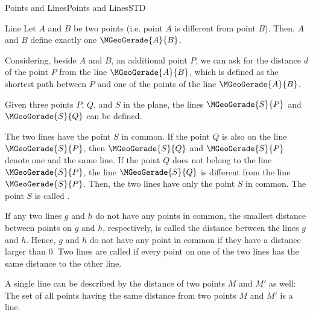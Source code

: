 \begin{MXContent}{Points and Lines}{Points and Lines}{STD}
\begin{MXInfo}{Line}
Let $A$ and $B$ be two points (i.e. point $A$ is different from point $B$). Then, $A$ and $B$ define
exactly one  $\MGeoGerade{A}{B}$.
\end{MXInfo}

Considering, beside $A$ and $B$, an additional point $P$, we can ask for the distance $d$ of the point 
$P$ from the line $\MGeoGerade{A}{B}$, which is defined as the shortest path between $P$ and one of 
the points of the line $\MGeoGerade{A}{B}$.

\begin{center}
\end{center}

Given three points $P$, $Q$, and $S$ in the plane, the lines $\MGeoGerade{S}{P}$ and 
$\MGeoGerade{S}{Q}$ can be defined.

The two lines have the point $S$ in common. If the point $Q$ is also on the line $\MGeoGerade{S}{P}$,
then $\MGeoGerade{S}{Q}$ and $\MGeoGerade{S}{P}$ denote one and the same line. If the 
point $Q$ does not belong to the line $\MGeoGerade{S}{P}$, the line $\MGeoGerade{S}{Q}$ is
different from the line $\MGeoGerade{S}{P}$. Then, the two lines have only the point $S$ in common.
The point $S$ is called . 

If any two lines $g$ and $h$ do not have any points in common, the smallest 
distance between points on $g$ and $h$, respectively, is called the distance between 
the lines $g$ and $h$. Hence, $g$ and $h$ do not have any point in common if they have 
a distance larger than $0$. Two lines are called  if every point 
on one of the two lines has the same distance to the other line.

A single line can be described by the distance of two points $M$ and $M'$ as well: The set 
of all points having the same distance from two points $M$ and $M'$ is a line.


\end{MXContent}
